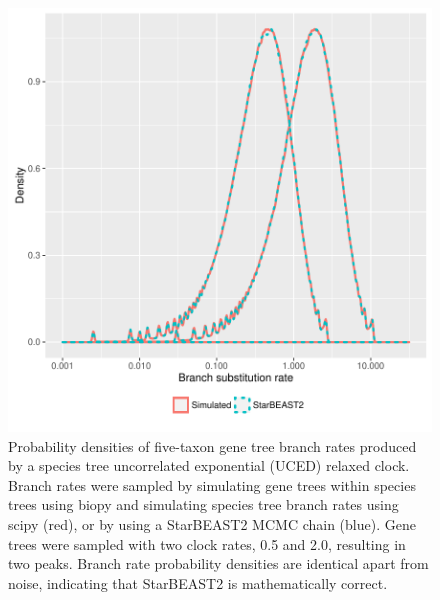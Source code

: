 \documentclass[12pt]{article}
\begin{document}
\begin{figure}[htb!]
\centering
\includegraphics[width=130mm]{exp_gene_branch_rates.pdf}
\caption
{Probability densities of five-taxon gene tree branch rates produced by a
species tree uncorrelated exponential (UCED) relaxed clock. Branch rates were
sampled by simulating gene trees within species trees using biopy and simulating
species tree branch rates using scipy (red), or by using a StarBEAST2 MCMC chain
(blue). Gene trees were sampled with two clock rates, 0.5 and 2.0, resulting in
two peaks. Branch rate probability densities are identical apart from noise,
indicating that StarBEAST2 is mathematically correct.}
\label{fig:geneBranchRatesUCED}
\end{figure}

\clearpage
\end{document}
